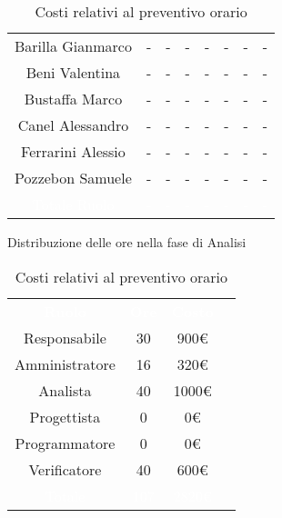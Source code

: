 \begin{table}[h!]
\begin{minipage}[c]{0.53\textwidth}
\begin{tabular}{>{\raggedright\arraybackslash}c|cccccc|c}
		\rowcolor[RGB]{216, 235, 171}
	    	Barilla Gianmarco & - & - & - & - & - & -& -		\\[4pt]
	    \rowcolor[RGB]{233, 245, 206}
	    	Beni Valentina & - & - & - & - & - & -& -			\\[4pt]
	    \rowcolor[RGB]{216, 235, 171}
	    	Bustaffa Marco & - & - & - & - & - & -& -			\\[4pt]
        \rowcolor[RGB]{233, 245, 206}
	    	Canel Alessandro & - & - & - & - & - & -& -			\\[4pt]
        \rowcolor[RGB]{216, 235, 171}
	    	Ferrarini Alessio & - & - & - & - & - & -& -		\\[4pt]
        \rowcolor[RGB]{233, 245, 206}
	    	Pozzebon Samuele & - & - & - & - & - & -& -			\\[4pt]
		\rowcolor[RGB]{47, 106, 73}
			\textcolor{white}{Totale Ruolo} & \textcolor{white}{-} & \textcolor{white}{-} & \textcolor{white}{-} 
			& \textcolor{white}{-} & \textcolor{white}{-} & \textcolor{white}{-}
			& \textcolor{white}{-} \\[4pt]	
    \end{tabular}
    \caption{Distribuzione delle ore nella fase di Analisi}
\end{minipage}
\hfill
\begin{minipage}{0.33\textwidth}
	\centering
	\begin{tabular}{cccc}
	    \rowcolor[RGB]{33, 73, 50}
	    \textcolor{white}{\textbf{Ruolo}} & \textcolor{white}{\textbf{Ore}} & \textcolor{white}{\textbf{Costo}}\\[4pt]
	    \rowcolor[RGB]{216, 235, 171}
	    Responsabile & 30 & 900\euro\\[4pt]
	    \rowcolor[RGB]{233, 245, 206}
	    Amministratore & 16 & 320\euro\\[4pt]
        \rowcolor[RGB]{216, 235, 171}
	    Analista & 40 & 1000\euro\\[4pt]
	    \rowcolor[RGB]{233, 245, 206}
	    Progettista & 0 & 0\euro\\[4pt]
        \rowcolor[RGB]{216, 235, 171}
	    Programmatore & 0 & 0\euro\\[4pt]
	    \rowcolor[RGB]{233, 245, 206}
	    Verificatore & 40 & 600\euro\\[4pt]
		\rowcolor[RGB]{47, 106, 73}
			\textcolor{white}{Totale} & \textcolor{white}{107} & \textcolor{white}{2820\euro}\\[4pt]	
    \end{tabular}	
	\caption{Costi relativi al preventivo orario}

\end{minipage}
\end{table}

